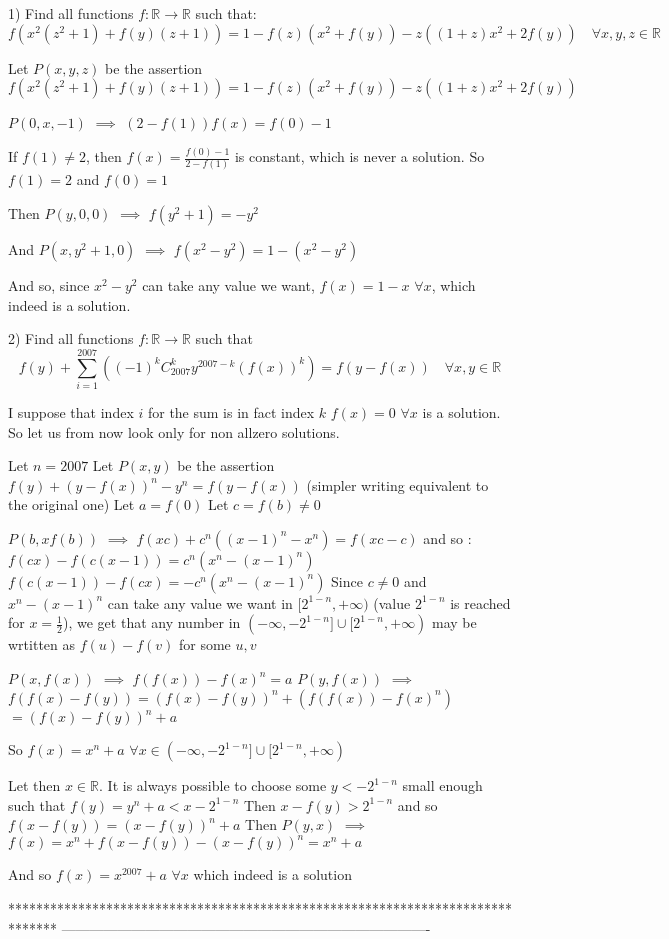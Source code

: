 \begin{solution}
	\begin{tcolorbox}1) Find all functions $f:\mathbb R \rightarrow \mathbb R $ such that:
\[f(x^2(z^2+1)+f(y)(z+1))=1-f(z)(x^2+f(y))-z((1+z)x^2+2f(y)) \quad \forall x,y,z \in \mathbb R\]\end{tcolorbox}
Let $P(x,y,z)$ be the assertion $f(x^2(z^2+1)+f(y)(z+1))=1-f(z)(x^2+f(y))-z((1+z)x^2+2f(y))$

$P(0,x,-1)$ $\implies$ $(2-f(1))f(x)=f(0)-1$

If $f(1)\ne 2$, then $f(x)=\frac{f(0)-1}{2-f(1)}$ is constant, which is never a solution. So $f(1)=2$ and $f(0)=1$

Then $P(y,0,0)$ $\implies$ $f(y^2+1)=-y^2$

And $P(x,y^2+1,0)$ $\implies$ $f(x^2-y^2)=1-(x^2-y^2)$

And so, since $x^2-y^2$ can take any value we want, $\boxed{f(x)=1-x}$ $\forall x$, which indeed is a solution.
\end{solution}



\begin{solution}
	\begin{tcolorbox}2) Find all functions $f:\mathbb{R}\rightarrow \mathbb{R}$ such that 
\[f(y)+\sum_{i=1}^{2007}\left ( (-1)^kC_{2007}^{k}y^{2007-k}(f(x))^k\right  )=f(y-f(x)) \quad \forall x,y \in \mathbb R\]\end{tcolorbox}
I suppose that index $i$ for the sum is in fact index $k$
$\boxed{f(x)=0}$ $\forall x$ is a solution. So let us from now look only for non allzero solutions.

Let $n=2007$
Let $P(x,y)$ be the assertion $f(y)+(y-f(x))^n-y^n=f(y-f(x))$ (simpler writing equivalent to the original one)
Let $a=f(0)$
Let $c=f(b)\ne 0$

$P(b,xf(b))$ $\implies$ $f(xc)+c^n((x-1)^n-x^n)=f(xc-c)$ and so :
$f(cx)-f(c(x-1))=c^n(x^n-(x-1)^n)$
$f(c(x-1))-f(cx)=-c^n(x^n-(x-1)^n)$
Since  $c\ne 0$ and  $x^n-(x-1)^n$ can take any value we want in $[2^{1-n},+\infty)$ (value $2^{1-n}$ is reached for $x=\frac 12$), we get that any number in $(-\infty,-2^{1-n}]\cup[2^{1-n},+\infty)$ may be wrtitten as $f(u)-f(v)$ for some $u,v$

$P(x,f(x))$ $\implies$ $f(f(x))-f(x)^n=a$
$P(y,f(x))$ $\implies$ $f(f(x)-f(y))=(f(x)-f(y))^n+(f(f(x))-f(x)^n)$ $=(f(x)-f(y))^n+a$

So $f(x)=x^n+a$ $\forall x\in(-\infty,-2^{1-n}]\cup[2^{1-n},+\infty)$

Let then $x\in\mathbb R$. It is always possible to choose some $y<-2^{1-n}$ small enough such that $f(y)=y^n+a<x-2^{1-n}$
Then $x-f(y)>2^{1-n}$ and so $f(x-f(y))=(x-f(y))^n+a$
Then $P(y,x)$ $\implies$ $f(x)=x^n+f(x-f(y))-(x-f(y))^n = x^n+a$

And so $\boxed{f(x)=x^{2007}+a}$ $\forall x$ which indeed is a solution
\end{solution}
*******************************************************************************
-------------------------------------------------------------------------------

